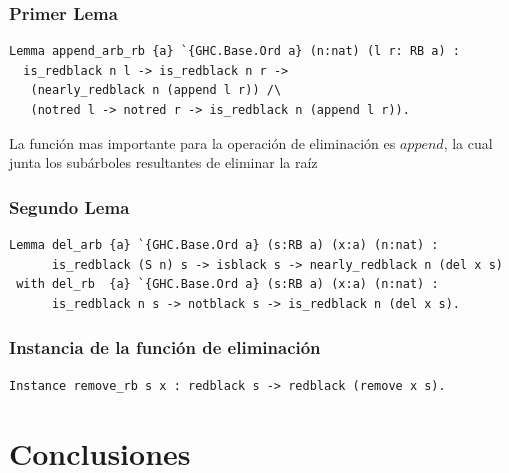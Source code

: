 \documentclass[8pt,leqno,pdflatex,spanish]{book}
\theoremstyle{plain}
\theoremstyle{definition}
\theoremstyle{remark}
\begin{document}
\subsection{Primer Lema}
\begin{verbatim}
Lemma append_arb_rb {a} `{GHC.Base.Ord a} (n:nat) (l r: RB a) : 
  is_redblack n l -> is_redblack n r ->
   (nearly_redblack n (append l r)) /\
   (notred l -> notred r -> is_redblack n (append l r)).
\end{verbatim}

La funci\'on mas importante para la operaci\'on de eliminaci\'on es $append$, la cual junta 
los subárboles resultantes de eliminar la raíz 

\subsection{Segundo Lema}
\begin{verbatim}
Lemma del_arb {a} `{GHC.Base.Ord a} (s:RB a) (x:a) (n:nat) :
      is_redblack (S n) s -> isblack s -> nearly_redblack n (del x s)
 with del_rb  {a} `{GHC.Base.Ord a} (s:RB a) (x:a) (n:nat) :
      is_redblack n s -> notblack s -> is_redblack n (del x s).
\end{verbatim}

\subsection{Instancia de la funci\'on de eliminaci\'on}
\begin{verbatim}
Instance remove_rb s x : redblack s -> redblack (remove x s).
\end{verbatim}
\chapter{Conclusiones}  
\backmatter%
\end{document}
